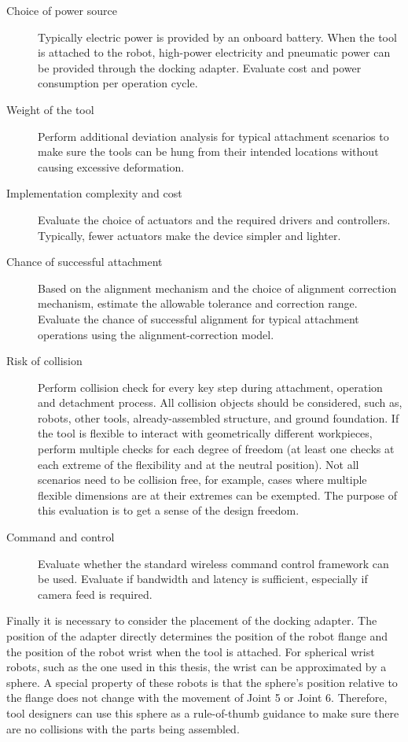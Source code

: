 \begin{description}
	\item [Choice of power source] Typically electric power is provided by an onboard battery. When the tool is attached to the robot, high-power electricity and pneumatic power can be provided through the docking adapter. Evaluate cost and power consumption per operation cycle.

	\item [Weight of the tool] Perform additional deviation analysis for typical attachment scenarios to make sure the tools can be hung from their intended locations without causing excessive deformation.

	\item [Implementation complexity and cost] Evaluate the choice of actuators and the required drivers and controllers. Typically, fewer actuators make the device simpler and lighter.

	\item [Chance of successful attachment] Based on the alignment mechanism and the choice of alignment correction mechanism, estimate the allowable tolerance and correction range. Evaluate the chance of successful alignment for typical attachment operations using the alignment-correction model. 

	\item [Risk of collision] Perform collision check for every key step during attachment, operation and detachment process. All collision objects should be considered, such as, robots, other tools, already-assembled structure, and ground foundation. If the tool is flexible to interact with geometrically different workpieces, perform multiple checks for each degree of freedom (at least one checks at each extreme of the flexibility and at the neutral position). Not all scenarios need to be collision free, for example, cases where multiple flexible dimensions are at their extremes can be exempted. The purpose of this evaluation is to get a sense of the design freedom. 

	\item [Command and control] Evaluate whether the standard wireless command control framework can be used. Evaluate if bandwidth and latency is sufficient, especially if camera feed is required.

\end{description}

Finally it is necessary to consider the placement of the docking adapter. The position of the adapter directly determines the position of the robot flange and the position of the robot wrist when the tool is attached. For spherical wrist robots, such as the one used in this thesis, the wrist can be approximated by a sphere. A special property of these robots is that the sphere’s position relative to the flange does not change with the movement of Joint 5 or Joint 6. Therefore, tool designers can use this sphere as a rule-of-thumb guidance to make sure there are no collisions with the parts being assembled.

